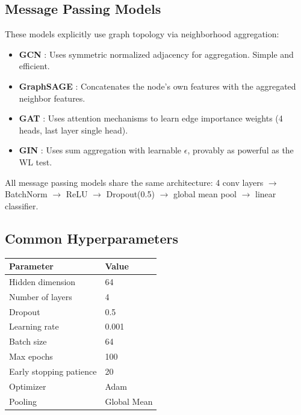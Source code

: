 \documentclass[11pt]{article}
\begin{document}
\subsection{Message Passing Models}
These models explicitly use graph topology via neighborhood aggregation:

\begin{itemize}
    \item \textbf{GCN} \cite{kipf2017semi}: Uses symmetric normalized adjacency for aggregation. Simple and efficient.
    \item \textbf{GraphSAGE} \cite{hamilton2017inductive}: Concatenates the node's own features with the aggregated neighbor features.
    \item \textbf{GAT} \cite{velickovic2018graph}: Uses attention mechanisms to learn edge importance weights (4 heads, last layer single head).
    \item \textbf{GIN} \cite{xu2019powerful}: Uses sum aggregation with learnable $\epsilon$, provably as powerful as the WL test.
\end{itemize}

All message passing models share the same architecture: 4 conv layers $\rightarrow$ BatchNorm $\rightarrow$ ReLU $\rightarrow$ Dropout(0.5) $\rightarrow$ global mean pool $\rightarrow$ linear classifier.

\subsection{Common Hyperparameters}
\begin{table}[H]
\centering
\begin{tabular}{ll}
\toprule
\textbf{Parameter} & \textbf{Value} \\
\midrule
Hidden dimension & 64 \\
Number of layers & 4 \\
Dropout & 0.5 \\
Learning rate & 0.001 \\
Batch size & 64 \\
Max epochs & 100 \\
Early stopping patience & 20 \\
Optimizer & Adam \\
Pooling & Global Mean \\
\bottomrule
\end{tabular}
\end{table}

\end{document}

